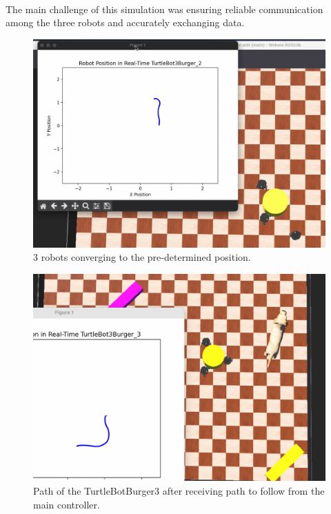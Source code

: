 \paragraph*{}
The main challenge of this simulation was ensuring reliable communication among the three robots and accurately exchanging data.


\begin{figure} [H]
    \centering
    \includegraphics[width=0.75\linewidth]{assets/images/simulation_overview/sim_2.png}
    \caption{3 robots converging to the pre-determined position.}
    \label{fig:simulation_overview2}
\end{figure}

\begin{figure} [H]
        \centering
        \includegraphics[width=0.75\linewidth]{assets/images/simulation_overview/sim_1.png}
        \caption{Path of the TurtleBotBurger3 after receiving path to follow from the main controller.}
        \label{fig:simulation_overview1} 
    \end{figure}
